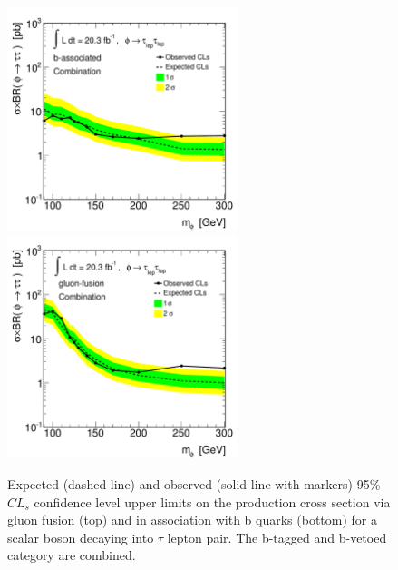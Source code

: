 \begin{figure}[tp]
  \centering
 \includegraphics[width=0.6\textwidth]{figure/limits_tesi/limit_Xsec_bbA_comb.pdf}
 \includegraphics[width=0.6\textwidth]{figure/limits_tesi/limit_Xsec_ggA_comb.pdf}
  \caption{Expected (dashed line) and observed (solid line with markers) 95\%  $CL_s$ confidence level upper limits on 
	the production cross section via gluon fusion  (top) and in association with b quarks (bottom) for 
	a scalar boson decaying into  $\tau$ lepton pair. The b-tagged and b-vetoed category are combined.}
\label{fig:limit_xs}
\end{figure}


